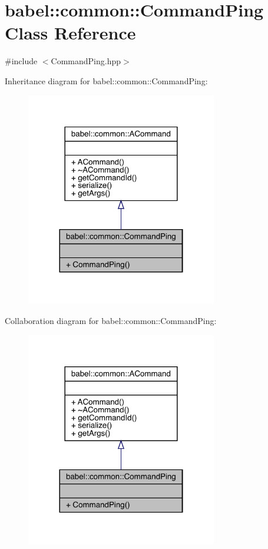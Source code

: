 \hypertarget{classbabel_1_1common_1_1_command_ping}{}\section{babel\+:\+:common\+:\+:Command\+Ping Class Reference}
\label{classbabel_1_1common_1_1_command_ping}


{\ttfamily \#include $<$Command\+Ping.\+hpp$>$}



Inheritance diagram for babel\+:\+:common\+:\+:Command\+Ping\+:\nopagebreak
\begin{figure}[H]
\begin{center}
\leavevmode
\includegraphics[width=236pt]{classbabel_1_1common_1_1_command_ping__inherit__graph}
\end{center}
\end{figure}


Collaboration diagram for babel\+:\+:common\+:\+:Command\+Ping\+:\nopagebreak
\begin{figure}[H]
\begin{center}
\leavevmode
\includegraphics[width=236pt]{classbabel_1_1common_1_1_command_ping__coll__graph}
\end{center}
\end{figure}
